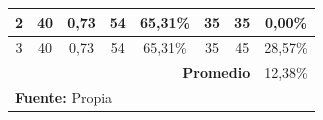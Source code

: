 \begin{landscape}
\begin{table}[H]
\begin{center}
\begin{tabular}{|c|c|c|c|c|c|c|c|}
2                & 40                                                                   & 0,73                                                                                     & 54                                                                            & 65,31\%                                                                               & 35                                                                                      & 35                                                                                      & 0,00\%                                                                                            \\ \hline
3                & 40                                                                   & 0,73                                                                                     & 54                                                                            & 65,31\%                                                                               & 35                                                                                      & 45                                                                                      & 28,57\%                                                                                           \\ \hline
\multicolumn{7}{|r|}{\textbf{Promedio}}                                                                                                                                                                                                                                                                                                                                                                                                                                                                                                        & 12,38\%                                                                                           \\ \hline
 \multicolumn{8}{l}{\textbf{Fuente:} Propia}
\end{tabular}
\end{center}
\end{table}


\end{landscape}
